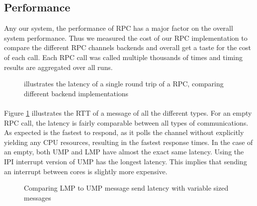 \subsection{Performance}
\label{mp:perf_subs}



Any our system, the performance of RPC has a major factor on the overall system performance. Thus we measured the cost of our RPC implementation to compare the different RPC channels backends and overall get a taste for the cost of each call. Each RPC call was called multiple thousands of times and timing results are aggregated over all runs.




\begin{figure}[h!]
    \centering
    
    \scalebox{0.5}{
        \hspace{-0.40in}
        
    }
    \caption{illustrates the latency of a single round trip of a  RPC, comparing different backend implementations }
    \label{fig:rpc_rtt}
    
\end{figure}


\paragraph{}
Figure \ref{fig:rpc_rtt} illustrates the RTT of a  message of all the different types. For an empty RPC call, the latency is fairly comparable between all types of communications. As expected  is the fastest to respond, as it polls the channel without explicitly yielding any CPU resources, resulting in the fastest response times. In the case of an empty, both UMP and LMP have almost the exact same latency. Using the IPI interrupt version of UMP has the longest latency. This implies that sending an interrupt between cores is slightly more expensive.

\begin{figure}[ht]
    \centering
    
        \scalebox{0.5}{
            \hspace{-0.40in}
            
        }
    \caption{Comparing LMP to UMP message send latency with variable sized messages}
    \label{fig:lmp_vs_ump}
    
\end{figure}


